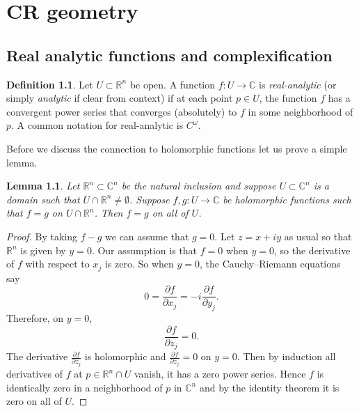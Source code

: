 \documentclass[12pt,openany]{book}
\newcommand{\C}{{\mathbb{C}}}
\newcommand{\R}{{\mathbb{R}}}
\newcommand{\myindex}[1]{#1\index{#1}}
\theoremstyle{plain}
\newtheorem{lemma}[thm]{Lemma}
\theoremstyle{remark}
\theoremstyle{definition}
\newtheorem{defn}[thm]{Definition}
\theoremstyle{exercise}
\theoremstyle{example}
\begin{document}

\chapter{CR geometry} \label{ch:crgeometry}


\section{Real analytic functions and complexification}

\begin{defn}
Let $U \subset \R^n$ be open.
A function $f \colon U \to \C$ is 
\emph{\myindex{real-analytic}} (or simply \emph{analytic} if
clear from context) if at each point $p \in U$, the function $f$
has a convergent power series that converges (absolutely) to $f$ in some
neighborhood of $p$.
A common notation for real-analytic is $C^\omega$.
\end{defn}

Before we discuss the connection to holomorphic functions let us prove a simple
lemma.

\begin{lemma}
Let $\R^n \subset \C^n$ be the natural inclusion and suppose
$U \subset \C^n$ is a domain such that $U \cap \R^n \not= \emptyset$.
Suppose $f,g \colon U \to \C$ be holomorphic functions such that
$f=g$ on $U \cap \R^n$.  Then $f=g$ on all of $U$.
\end{lemma}

\begin{proof}
By taking $f-g$ we can assume that $g=0$.
Let $z = x+iy$ as usual so that $\R^n$ is given by $y=0$.
Our assumption is that $f = 0$ when $y=0$,
so the derivative of $f$ with respect to $x_j$ is zero.
So when $y=0$,
the Cauchy--Riemann equations say
\begin{equation*}
0 = \frac{\partial f}{\partial x_j} =
-i \frac{\partial f}{\partial y_j} .
\end{equation*}
Therefore, on $y=0$,
\begin{equation*}
\frac{\partial f }{\partial z_j} = 0 .
\end{equation*}
The derivative $\frac{\partial f }{\partial z_j}$ is holomorphic
and $\frac{\partial f }{\partial z_j} = 0$ on $y=0$.  Then
by induction all derivatives of $f$ at $p \in \R^n \cap U$ vanish, it has a zero 
power series.  Hence $f$ is identically zero in a neighborhood of
$p$ in $\C^n$ and by the identity theorem it is zero on all of $U$.
\end{proof}
\end{document}
